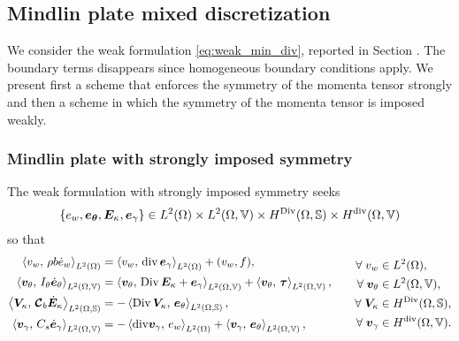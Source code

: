 \subsection{Mindlin plate mixed discretization}
We consider the weak formulation \eqref{eq:weak_min_div}, reported in Section . The boundary terms disappears since homogeneous boundary conditions apply. We present first a scheme that enforces the symmetry of the momenta tensor strongly and then a scheme in which the symmetry of the momenta tensor is imposed weakly.

\subsubsection{Mindlin plate with strongly imposed symmetry}\label{sec:min_strong}
The weak formulation with strongly imposed symmetry seeks 
$$\{e_w, \bm{e}_{\bm{\theta}}, \bm{E}_{\kappa}, \bm{e}_{\gamma}\} \in L^2(\Omega) \times L^2(\Omega, \mathbb{V}) \times H^{\operatorname*{Div}}(\Omega, \mathbb{S}) \times H^{\operatorname{div}}(\Omega, \mathbb{V})$$
 so that 
\begin{equation}
\label{eq:weak_min_div_strong}
\begin{aligned}
\inner[L^2(\Omega)]{v_w}{\rho b \dot{e}_w} &= \inner[L^2(\Omega)]{v_w}{\div \bm{e}_\gamma} + (v_w, f), \\ 
\inner[L^2(\Omega, \mathbb{V})]{\bm{v}_\theta}{I_\theta \dot{\bm{e}}_\theta} &= \inner[L^2(\Omega, \mathbb{V})]{\bm{v}_\theta}{\Div \bm{E}_\kappa + \bm{e}_\gamma} + \inner[L^2(\Omega, \mathbb{V})]{\bm{v}_\theta}{\bm{\tau}}, \\  
\inner[L^2(\Omega, \mathbb{S})]{\bm{V}_\kappa}{\bm{\mathcal{C}}_{b} \dot{\bm{E}}_\kappa} &= -\inner[L^2(\Omega, \mathbb{S})]{\Div \bm{V}_\kappa}{\bm{e}_\theta}, \\ 
\inner[L^2(\Omega, \mathbb{V})]{\bm{v}_\gamma}{C_s \dot{\bm{e}}_\gamma} &= -\inner[L^2(\Omega)]{\mathrm{div} \bm{v}_\gamma}{e_w} + \inner[L^2(\Omega, \mathbb{V})]{\bm{v}_\gamma}{\bm{e}_{\theta}}, \\ 
\end{aligned} \qquad
\begin{aligned}
\forall\; v_w &\in L^2(\Omega), \\
\forall\; \bm{v}_\theta &\in L^2(\Omega, \mathbb{V}), \\
\forall\; \bm{V}_\kappa &\in H^{\Div}(\Omega, \mathbb{S}), \\
\forall\; \bm{v}_\gamma &\in H^{\div}(\Omega, \mathbb{V}).
\end{aligned}
\end{equation}


